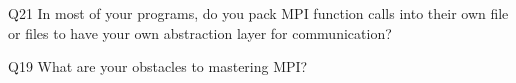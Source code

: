 \begin{description}%
\item{Q21} In most of your programs, do you pack MPI function calls into their own file or files to have your own abstraction layer for communication?%
\item{Q19} What are your obstacles to mastering MPI?%
\end{description}%
